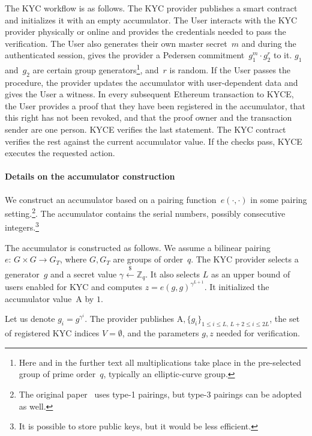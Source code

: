 The KYC workflow is as follows.
The KYC provider publishes a smart contract and initializes it with an empty accumulator.
The User interacts with the KYC provider physically or online and provides the credentials needed to pass the verification.
The User also generates their own master secret~$m$ and during the authenticated session, gives the provider a Pedersen commitment~$g_1^m\cdot g_2^r$ to it.
$g_1$ and~$g_2$ are certain group generators\footnote{Here and in the further text all multiplications take place in the pre-selected group of prime order~$q$, typically an elliptic-curve group.}, and~$r$ is random.
If the User passes the procedure, the provider updates the accumulator with user-dependent data and gives the User a witness.
In every subsequent Ethereum transaction to KYCE, the User provides a proof that they have been registered in the accumulator, that this right has not been revoked, and that the proof owner and the transaction sender are one person.
KYCE verifies the last statement.
The KYC contract verifies the rest against the current accumulator value.
If the checks pass, KYCE executes the requested action.

\paragraph{Details on the accumulator construction}
We construct an accumulator based on a pairing function~$e(\cdot,\cdot)$ in some pairing setting.\footnote{The original paper~\cite{Camenisch2009} uses type-1 pairings, but type-3 pairings can be adopted as well.}.
The accumulator contains the serial numbers, possibly consecutive integers.\footnote{It is possible to store public keys, but it would be less efficient.}

The accumulator is constructed as follows.
We assume a bilinear pairing~$e:\,G\times G\rightarrow G_T$, where $G,G_T$ are groups of order~$q$.
The KYC provider selects a generator~$g$ and a secret value $\gamma\overset{\$}{\leftarrow} \mathbb{Z}_q$.
It also selects $L$ as an upper bound of users enabled for KYC and computes $z = e(g,g)^{\gamma^{L+1}}$.
It initialized the accumulator value~$\mathrm{A}$ by $1$. 

Let us denote $g_i = g^{\gamma^i}$.
The provider publishes $\mathrm{A},\{g_i\}_{1\leq i\leq L, \,L+2\leq i \leq 2L}$, the set of registered KYC indices $V=\emptyset$, and the parameters $g,z$ needed for verification.

